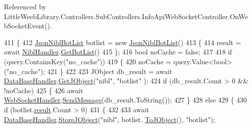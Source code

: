Referenced by Little\+Weeb\+Library.\+Controllers.\+Sub\+Controllers.\+Info\+Api\+Web\+Socket\+Controller.\+On\+Web\+Socket\+Event().


\begin{DoxyCode}
411         \{
412             \mbox{\hyperlink{class_little_weeb_library_1_1_models_1_1_json_nibl_bot_list}{JsonNiblBotList}} botlist = \textcolor{keyword}{new} \mbox{\hyperlink{class_little_weeb_library_1_1_models_1_1_json_nibl_bot_list}{JsonNiblBotList}}()
413             \{
414                 result = await \mbox{\hyperlink{class_little_weeb_library_1_1_handlers_1_1_nibl_handler}{NiblHandler}}.\mbox{\hyperlink{class_little_weeb_library_1_1_handlers_1_1_nibl_handler_aac05976a2e1a688dd187ccca513ab3cc}{GetBotList}}()
415             \};
416             \textcolor{keywordtype}{bool} noCache = \textcolor{keyword}{false};
417 
418             \textcolor{keywordflow}{if} (query.ContainsKey(\textcolor{stringliteral}{"no\_cache"}))
419             \{
420                 noCache = query.Value<\textcolor{keywordtype}{bool}>(\textcolor{stringliteral}{"no\_cache"});
421             \}
422 
423             JObject db\_result = await \mbox{\hyperlink{class_little_weeb_library_1_1_handlers_1_1_data_base_handler}{DataBaseHandler}}.\mbox{\hyperlink{class_little_weeb_library_1_1_handlers_1_1_data_base_handler_a7f61583807f99b7838a33d2db0f7ca68}{GetJObject}}(\textcolor{stringliteral}{"nibl"}, \textcolor{stringliteral}{"botlist"}
      );
424             \textcolor{keywordflow}{if} (db\_result.Count > 0 && !noCache)
425             \{
426                 await \mbox{\hyperlink{class_little_weeb_library_1_1_handlers_1_1_web_socket_handler}{WebSocketHandler}}.\mbox{\hyperlink{class_little_weeb_library_1_1_handlers_1_1_web_socket_handler_a1de289d54d665a32c93478c68d3e6ad0}{SendMessage}}(db\_result.ToString());
427             \}
428             \textcolor{keywordflow}{else}
429             \{
430                 \textcolor{keywordflow}{if} (botlist.\mbox{\hyperlink{class_little_weeb_library_1_1_models_1_1_json_nibl_bot_list_adbd5920212e2cb6bbf3f43fff328af92}{result}}.Count > 0)
431                 \{
432 
433                     await \mbox{\hyperlink{class_little_weeb_library_1_1_handlers_1_1_data_base_handler}{DataBaseHandler}}.\mbox{\hyperlink{class_little_weeb_library_1_1_handlers_1_1_data_base_handler_a5e6a70ef81b049da46b6ae3a15b09cd3}{StoreJObject}}(\textcolor{stringliteral}{"nibl"}, botlist.
      \mbox{\hyperlink{class_little_weeb_library_1_1_models_1_1_json_nibl_bot_list_a6c959577c5cc2851d1a2c830fd6f4961}{ToJObject}}(), \textcolor{stringliteral}{"botlist"});

\end{DoxyCode}
